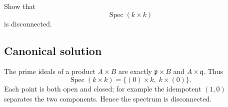 
\begin{exercise}
	Show that
	\[
	\operatorname{Spec}(k\times k)
	\]
	is disconnected.
\end{exercise}

\subsection*{Canonical solution}
The prime ideals of a product $A\times B$ are exactly $\mathfrak p\times B$ and $A\times\mathfrak q$. Thus
\[
\operatorname{Spec}(k\times k)=\{(0)\times k,\;k\times(0)\}.
\]
Each point is both open and closed; for example the idempotent $(1,0)$ separates the two components. Hence the spectrum is disconnected.
